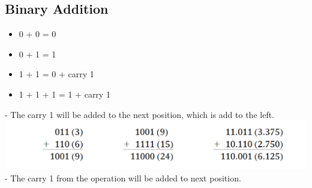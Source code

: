 \documentclass[12pt]{article}
\begin{document}
\subsection{Binary Addition}
\begin{itemize}
	\item 0 + 0  = 0
	\item 0 + 1 = 1
	\item 1 + 1 = 0 + carry 1
	\item 1 + 1 + 1 = 1 + carry 1
\end{itemize}
- The carry 1 will be added to the next position, which is add to the left. \\
\includegraphics[scale = 0.6]{hinh21}
\bigbreak
- The carry 1 from the operation will be added to next position. \\
\end{document}
